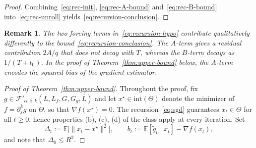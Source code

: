 \documentclass{article}
\newtheorem{remark}{Remark}[section]
\renewcommand{\leq}{\leqslant}
\renewcommand{\geq}{\geqslant}
\theoremstyle{definition}
\begin{document}
\begin{proof}
Combining~\eqref{eq:rec-init}, \eqref{eq:rec-A-bound} 
and~\eqref{eq:rec-B-bound} into~\eqref{eq:rec-unroll} 
yields~\eqref{eq:recursion-conclusion}.
\end{proof}

\begin{remark}
\label{rem:recursion}
The two forcing terms in~\eqref{eq:recursion-hypo} contribute 
qualitatively differently to the bound~\eqref{eq:recursion-conclusion}. 
The $A$-term gives a residual contribution $2A/q$ that does not 
decay with $T$, whereas the $B$-term decays as $1/(T+t_0)$.  
In the proof of
Theorem~\ref{thm:upper-bound} below, the $A$-term encodes the squared 
bias of the gradient estimator. 
\end{remark}


\begin{proof}[Proof of Theorem~\ref{thm:upper-bound}]
\label{proof:thm1}
Throughout the proof, fix 
$g\in\mathcal{F}'_{\alpha,\beta,k}(L,L_f,G,G_g,\bar{L})$ and 
let $x^\star\in\mathrm{int}(\Theta)$ denote the minimizer of 
$f=\partial_j^k g$ on $\Theta$, so that $\nabla f(x^\star)=0$. The 
recursion~\eqref{eq:sgd} guarantees $x_t\in\Theta$ for all 
$t\geq 0$, hence properties (b), (c), (d) of the class apply at 
every iteration. Set
\[
\Delta_t:=\mathbb{E}\bigl[\|x_t-x^\star\|^2\bigr],
\qquad 
b_t:=\mathbb{E}[\tilde{g}_t\mid x_t]-\nabla f(x_t),
\]
and note that $\Delta_0\leq R^2$.


\end{proof}
\end{document}

